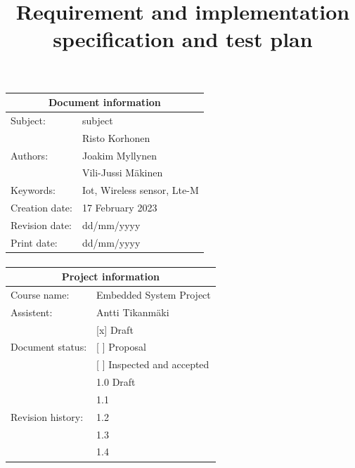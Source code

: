 \documentclass[]{dithesis}
\title{Requirement and implementation specification and test plan}
\begin{document}
\maketitle

\paragraph{}
\begin{center}
\begin{tabular}{|p{4cm}|p{8cm}|}
\hline
\multicolumn{2}{|c|}{Document information} \\
\hline
Subject: & subject \\
\hline
\multirow{3}{4em}{Authors:} & Risto Korhonen \\
& Joakim Myllynen \\
& Vili-Jussi M\"akinen \\
\hline
Keywords: & Iot, Wireless sensor, Lte-M \\
\hline
Creation date: & 17 February 2023 \\
\hline
Revision date: & dd/mm/yyyy \\
\hline
Print date: & dd/mm/yyyy \\
\hline
\end{tabular}
\end{center}


\paragraph{}
\begin{center}
\begin{tabular}{|p{4cm}|p{8cm}|}
\hline
\multicolumn{2}{|c|}{Project information} \\
\hline
Course name: & Embedded System Project \\
\hline
Assistent: & Antti Tikanm\"aki \\
\hline
\multirow{3}{4em}{Document status:} & [x] Draft\\
& [ ] Proposal \\
& [ ] Inspected and accepted\\
\hline
\multirow{5}{4em}{Revision history:} & 1.0 Draft\\
& 1.1 \\
& 1.2 \\
& 1.3 \\
& 1.4 \\
\hline
\end{tabular}
\end{center}
\end{document}
